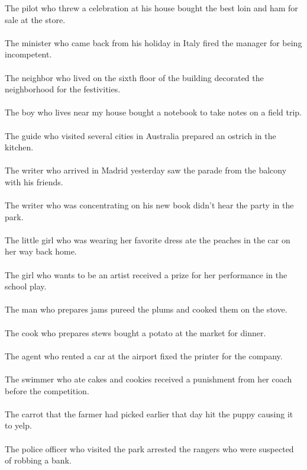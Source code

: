 The pilot who threw a celebration at his house bought the best loin and ham for sale at the store.	\\	\\
The minister who came back from his holiday in Italy fired the manager for being incompetent.	\\	\\
The neighbor who lived on the sixth floor of the building decorated the neighborhood for the festivities.	\\	\\
The boy who lives near my house bought a notebook to take notes on a field trip.	\\	\\
The guide who visited  several cities in Australia prepared an ostrich in the kitchen.	\\	\\
The writer who arrived in Madrid yesterday saw the parade from the balcony with his friends.	\\	\\
The writer who was concentrating on his new book didn't hear the party in the park.	\\	\\
The little girl who was wearing her favorite dress ate the peaches in the car on her way back home.	\\	\\
The girl who wants to be an artist received a prize for her performance in the school play.	\\	\\
The man who prepares jams pureed the plums and cooked them on the stove.	\\	\\
The cook who prepares stews bought a potato at the market for dinner.	\\	\\
The agent who rented a car at the airport fixed the printer for the company.	\\	\\
The swimmer who ate cakes and cookies received a punishment from her coach before the competition.	\\	\\
The carrot that the farmer had picked earlier that day hit the puppy causing it to yelp.	\\	\\
The police officer who visited the park arrested the rangers who were suspected of robbing a bank.	\\	\\
